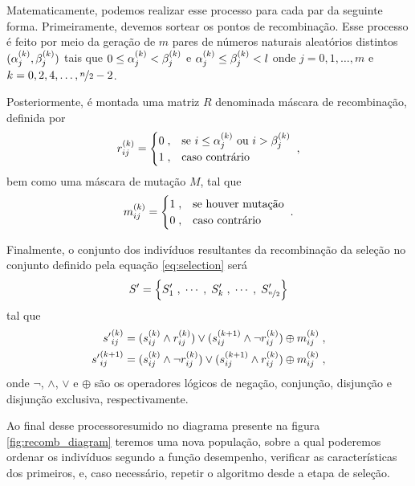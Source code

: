 Matematicamente, podemos realizar esse processo para cada par da seguinte forma. Primeiramente, devemos
sortear os pontos de recombinação. Esse processo é feito por meio da geração de $m$ pares
de números naturais aleatórios distintos $ ({\alpha}^{(k)}_{j}, {\beta}^{(k)}_{j}) $ tais que
$ 0 \leq {\alpha}^{(k)}_{j} < {\beta}^{(k)}_{j} $ e $ {\alpha}^{(k)}_{j} \leq {\beta}^{(k)}_{j} < l $ onde
$ j = 0, 1, \dots, m $ e $ k = 0, 2, 4, \dots, \nicefrac{n}{2} - 2 $.

Posteriormente, é montada uma matriz $R$ denominada máscara de recombinação, definida por
\begin{equation}
  {r}^{(k)}_{ij} =
  \begin{cases}
    0 \;, & \text{se } i \leq {\alpha}^{(k)}_{j} \text{ ou } i > {\beta}^{(k)}_{j} \\
    1 \;, & \text{caso contrário}
  \end{cases}
  \;\mathrm{,}
\end{equation}
bem como uma máscara de mutação $M$, tal que
\begin{equation}
  {m}^{(k)}_{ij} =
  \begin{cases}
    1 \;, & \text{se houver mutação} \\
    0 \;, & \text{caso contrário}
  \end{cases}
  \;\mathrm{.}
\end{equation}

Finalmente, o conjunto dos indivíduos resultantes da recombinação da seleção no conjunto definido
pela equação \ref{eq:selection} será
\begin{equation}
  S' = \left\{ S'_1\;, \;\cdots\;,  \;S'_k\;, \;\cdots\;, \;S'_{\nicefrac{n}{2}} \right\}
\end{equation}
tal que
\begin{subequations}
  \begin{align}
    {s'}^{(k)}_{ij}  & = ({s}^{(k)}_{ij} \land {r}^{(k)}_{ij}) \lor ({s}^{(k + 1)}_{ij} \land \lnot {r}^{(k)}_{ij}) \oplus {m}^{(k)}_{ij} \;\mathrm{,} \\
    {s'}^{(k + 1)}_{ij} & = ({s}^{(k)}_{ij} \land \lnot {r}^{(k)}_{ij}) \lor ({s}^{(k + 1)}_{ij} \land {r}^{(k)}_{ij}) \oplus {m}^{(k)}_{ij} \;\mathrm{,}
  \end{align}
\end{subequations}
onde $\lnot$, $\land$, $\lor$ e $\oplus$ são os operadores lógicos de negação, conjunção, disjunção e disjunção exclusiva,
respectivamente.

Ao final desse processo\trav resumido no diagrama presente na figura \ref{fig:recomb_diagram}\trav
teremos uma nova população, sobre a qual poderemos ordenar os indivíduos segundo a função desempenho, verificar
as características dos primeiros, e, caso necessário, repetir o algoritmo desde a etapa de seleção.

